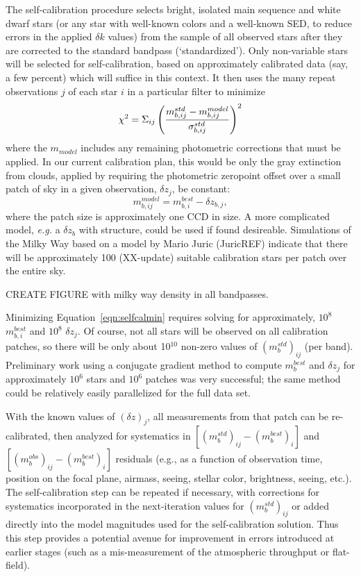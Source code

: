 \documentclass[12pt,preprint]{aastex}
\begin{document}
The self-calibration procedure selects bright, isolated main sequence
and white dwarf stars (or any star with well-known colors and a
well-known SED, to reduce errors in the applied
$\delta k$ values) from the sample of all observed stars after they are
corrected to the standard bandpass (`standardized'). Only non-variable stars will be
selected for self-calibration, based on approximately calibrated data
(say, a few percent) which will suffice in this context. It then uses
the many repeat observations $j$ of each star $i$ in a particular filter to minimize
\begin{equation}
\label{eqn:selfcalmin}
\chi^2 = \Sigma_{ij} \left(  { m_{b,ij}^{std} - m_{b,ij}^{model} \over
    \sigma_{b,ij}^{std} } \right)^2
\end{equation}
where the $m_{model}$ includes any remaining photometric corrections
that must be applied. In our current calibration plan, this would be only the
gray extinction from clouds, applied by requiring the photometric
zeropoint offset over a small patch of sky in a given observation, $\delta z_j$, be constant:
\begin{equation}
\label{eqn:zp}
m^{model}_{b,ij} = m^{best}_{b,i} - \delta z_{b,j},
\end{equation}
where the patch size is approximately one CCD in size. A more
complicated model, {\it e.g.} a $\delta z_{b}$ with structure, could
be used if found desireable. Simulations of the Milky Way based on a
model by Mario Juric (JuricREF) indicate that there will be
approximately 100 (XX-update)
suitable calibration stars per patch over the entire sky. 

CREATE FIGURE with milky way density in all bandpasses.

Minimizing Equation~\ref{eqn:selfcalmin} requires solving for
approximately, $10^8$ $m_{b,i}^{best}$ and $10^8$ $\delta z_j$. Of
course, not all stars will be observed on all calibration patches, so
there will be only about 10$^{10}$ non-zero values of
$(m_b^{std})_{ij}$ (per band). Preliminary work using a conjugate
gradient method to compute $m_{b}^{best}$ and $\delta z_j$ for
approximately $10^6$ stars and $10^6$ patches was very successful; the
same method could be relatively easily parallelized for the full data
set. 

With the known values of $(\delta z)_j$, all measurements from that
patch can be re-calibrated, then analyzed for systematics in
$[(m_b^{std})_{ij} - (m_b^{best})_{i}]$ and $[(m_b^{obs})_{ij} -
(m_b^{best})_{i}]$ residuals (e.g., as a function of observation time,
position on the focal plane, airmass, seeing, stellar color,
brightness, seeing, etc.). The self-calibration step can be repeated
if necessary, with corrections for systematics incorporated in the
next-iteration values for $(m_b^{std})_{ij}$ or added directly into
the model magnitudes used for the self-calibration solution. Thus this
step provides a potential avenue for improvement in errors introduced
at earlier stages (such as a mis-measurement of the atmospheric
throughput or flat-field). 
\end{document}
